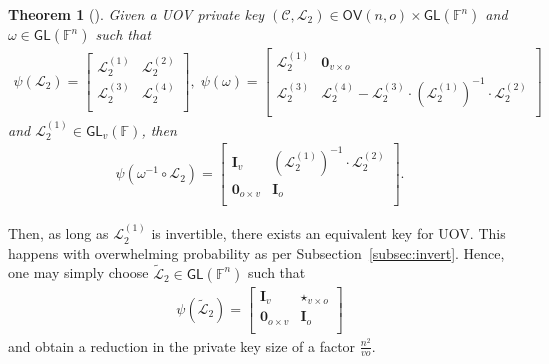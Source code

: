 \documentclass[12pt, a4paper, oneside]{memoir}
\newtheorem{theorem}{Theorem}[section]
\theoremstyle{definition}
\begin{document}
\begin{theorem}[{\cite[Thm.~2]{Beullens:201706}}]
  Given a UOV private key $(\mathcal{C}, \mathcal{L}_{2}) \in \mathsf{OV}(n, o) \times \mathsf{GL}(\mathbb{F}^{n})$ and $\omega \in \mathsf{GL}(\mathbb{F}^{n})$ such that
  \begin{align}
    \psi(\mathcal{L}_{2}) =
    \begin{bmatrix}
      \mathcal{L}_{2}^{(1)} & \mathcal{L}_{2}^{(2)} \\
      \mathcal{L}_{2}^{(3)} & \mathcal{L}_{2}^{(4)} \\
    \end{bmatrix},\;
    \psi(\omega) =
    \begin{bmatrix}
      \mathcal{L}_{2}^{(1)} & \mathbf{0}_{v \times o} \\
      \mathcal{L}_{2}^{(3)} & \mathcal{L}_{2}^{(4)} -\mathcal{L}_{2}^{(3)} \cdot (\mathcal{L}_{2}^{(1)})^{-1} \cdot \mathcal{L}_{2}^{(2)} \\
    \end{bmatrix}
  \end{align}
  and $\mathcal{L}_{2}^{(1)} \in \mathsf{GL}_{v}(\mathbb{F})$, then
  \begin{align}
    \psi(\omega^{-1} \circ \mathcal{L}_{2}) = \begin{bmatrix}
      \mathbf{I}_{v} & (\mathcal{L}_{2}^{(1)})^{-1} \cdot \mathcal{L}_{2}^{(2)} \\
      \mathbf{0}_{o \times v} & \mathbf{I}_{o} \\
    \end{bmatrix}.
  \end{align}
\end{theorem}

Then, as long as $\mathcal{L}_{2}^{(1)}$ is invertible, there exists an equivalent key for UOV. This happens with overwhelming probability as per Subsection~\ref{subsec:invert}. Hence, one may simply choose $\widetilde{\mathcal{L}}_{2} \in \mathsf{GL}(\mathbb{F}^{n})$ such that
\begin{align}
  \psi(\widetilde{\mathcal{L}}_{2}) =
  \begin{bmatrix}
    \mathbf{I}_{v}          & \star_{v \times o} \\
    \mathbf{0}_{o \times v} & \mathbf{I}_{o} \\
  \end{bmatrix}
\end{align}
and obtain a reduction in the private key size of a factor $\frac{n^{2}}{v o}$.
\end{document}
